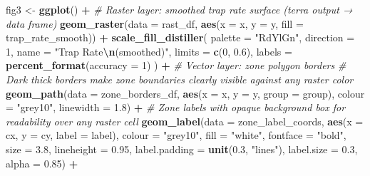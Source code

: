 \documentclass[
]{article}
\newenvironment{Shaded}{\begin{snugshade}}{\end{snugshade}}
\newcommand{\AttributeTok}[1]{\textcolor[rgb]{0.13,0.29,0.53}{#1}}
\newcommand{\CommentTok}[1]{\textcolor[rgb]{0.56,0.35,0.01}{\textit{#1}}}
\newcommand{\DecValTok}[1]{\textcolor[rgb]{0.00,0.00,0.81}{#1}}
\newcommand{\FloatTok}[1]{\textcolor[rgb]{0.00,0.00,0.81}{#1}}
\newcommand{\FunctionTok}[1]{\textcolor[rgb]{0.13,0.29,0.53}{\textbf{#1}}}
\newcommand{\NormalTok}[1]{#1}
\newcommand{\OtherTok}[1]{\textcolor[rgb]{0.56,0.35,0.01}{#1}}
\newcommand{\SpecialCharTok}[1]{\textcolor[rgb]{0.81,0.36,0.00}{\textbf{#1}}}
\newcommand{\StringTok}[1]{\textcolor[rgb]{0.31,0.60,0.02}{#1}}
\begin{document}
\begin{Shaded}
\begin{Highlighting}[]
\NormalTok{fig3 }\OtherTok{\textless{}{-}} \FunctionTok{ggplot}\NormalTok{() }\SpecialCharTok{+}
  \CommentTok{\# Raster layer: smoothed trap rate surface (terra output → data frame)}
  \FunctionTok{geom\_raster}\NormalTok{(}\AttributeTok{data =}\NormalTok{ rast\_df,}
              \FunctionTok{aes}\NormalTok{(}\AttributeTok{x =}\NormalTok{ x, }\AttributeTok{y =}\NormalTok{ y, }\AttributeTok{fill =}\NormalTok{ trap\_rate\_smooth)) }\SpecialCharTok{+}
  \FunctionTok{scale\_fill\_distiller}\NormalTok{(}
    \AttributeTok{palette   =} \StringTok{"RdYlGn"}\NormalTok{,}
    \AttributeTok{direction =} \DecValTok{1}\NormalTok{,}
    \AttributeTok{name      =} \StringTok{"Trap Rate}\SpecialCharTok{\textbackslash{}n}\StringTok{(smoothed)"}\NormalTok{,}
    \AttributeTok{limits    =} \FunctionTok{c}\NormalTok{(}\DecValTok{0}\NormalTok{, }\FloatTok{0.6}\NormalTok{),}
    \AttributeTok{labels    =} \FunctionTok{percent\_format}\NormalTok{(}\AttributeTok{accuracy =} \DecValTok{1}\NormalTok{)}
\NormalTok{  ) }\SpecialCharTok{+}
  \CommentTok{\# Vector layer: zone polygon borders}
  \CommentTok{\# Dark thick borders make zone boundaries clearly visible against any raster color}
  \FunctionTok{geom\_path}\NormalTok{(}\AttributeTok{data      =}\NormalTok{ zone\_borders\_df,}
            \FunctionTok{aes}\NormalTok{(}\AttributeTok{x =}\NormalTok{ x, }\AttributeTok{y =}\NormalTok{ y, }\AttributeTok{group =}\NormalTok{ group),}
            \AttributeTok{colour    =} \StringTok{"grey10"}\NormalTok{,}
            \AttributeTok{linewidth =} \FloatTok{1.8}\NormalTok{) }\SpecialCharTok{+}
  \CommentTok{\# Zone labels with opaque background box for readability over any raster cell}
  \FunctionTok{geom\_label}\NormalTok{(}\AttributeTok{data          =}\NormalTok{ zone\_label\_coords,}
             \FunctionTok{aes}\NormalTok{(}\AttributeTok{x =}\NormalTok{ cx, }\AttributeTok{y =}\NormalTok{ cy, }\AttributeTok{label =}\NormalTok{ label),}
             \AttributeTok{colour        =} \StringTok{"grey10"}\NormalTok{,}
             \AttributeTok{fill          =} \StringTok{"white"}\NormalTok{,}
             \AttributeTok{fontface      =} \StringTok{"bold"}\NormalTok{,}
             \AttributeTok{size          =} \FloatTok{3.8}\NormalTok{,}
             \AttributeTok{lineheight    =} \FloatTok{0.95}\NormalTok{,}
             \AttributeTok{label.padding =} \FunctionTok{unit}\NormalTok{(}\FloatTok{0.3}\NormalTok{, }\StringTok{"lines"}\NormalTok{),}
             \AttributeTok{label.size    =} \FloatTok{0.3}\NormalTok{,}
             \AttributeTok{alpha         =} \FloatTok{0.85}\NormalTok{) }\SpecialCharTok{+}

\end{Highlighting}
\end{Shaded}
\end{document}
